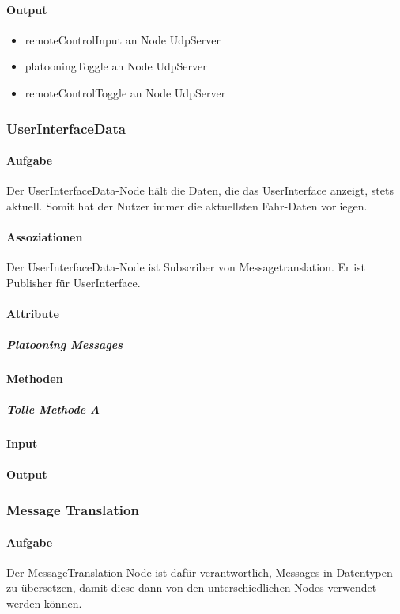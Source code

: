 \documentclass[a4paper, 12pt, titlepage]{scrartcl}
\begin{document}
				\paragraph{Output}
				    \begin{itemize}
				        \item remoteControlInput an Node UdpServer
				        \item platooningToggle an Node UdpServer
				        \item remoteControlToggle an Node UdpServer
				    \end{itemize}
				    
			\subsubsection{UserInterfaceData}
			\label{user_interface_data}
				\paragraph{Aufgabe} Der UserInterfaceData-Node hält die Daten, die das UserInterface anzeigt, stets aktuell. Somit hat der Nutzer immer die aktuellsten Fahr-Daten vorliegen. 
				\paragraph{Assoziationen} Der UserInterfaceData-Node ist Subscriber von Messagetranslation. Er ist Publisher für UserInterface. 
				\paragraph{Attribute}
					\subparagraph{Platooning Messages}
				\paragraph{Methoden}
					\subparagraph{Tolle Methode A}
				\paragraph{Input}
				\paragraph{Output}
			
			\subsubsection{Message Translation}
			\label{message_translation}
				\paragraph{Aufgabe} Der MessageTranslation-Node ist dafür verantwortlich, Messages in Datentypen zu übersetzen, damit diese dann von den unterschiedlichen Nodes verwendet werden können. 
\end{document}
